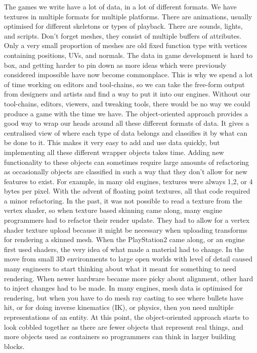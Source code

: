 \documentclass[a4paper,12pt]{article}
\begin{document}
The games we write have a lot of data, in a lot of different formats.
We have textures in multiple formats for multiple platforms.
There are animations, usually optimised for different skeletons or types of playback.
There are sounds, lights, and scripts.
Don't forget meshes, they consist of multiple buffers of attributes.
Only a very small proportion of meshes are old fixed function type with vertices containing positions, UVs, and normals.
The data in game development is hard to box, and getting harder to pin down as more ideas which were previously considered impossible have now become commonplace.
This is why we spend a lot of time working on editors and tool-chains, so we can take the free-form output from designers and artists and find a way to put it into our engines.
Without our tool-chains, editors, viewers, and tweaking tools, there would be no way we could produce a game with the time we have.
The object-oriented approach provides a good way to wrap our heads around all these different formats of data.
It gives a centralised view of where each type of data belongs and classifies it by what can be done to it.
This makes it very easy to add and use data quickly, but implementing all these different wrapper objects takes time.
Adding new functionality to these objects can sometimes require large amounts of refactoring as occasionally objects are classified in such a way that they don't allow for new features to exist.
For example, in many old engines, textures were always 1,2, or 4 bytes per pixel.
With the advent of floating point textures, all that code required a minor refactoring.
In the past, it was not possible to read a texture from the vertex shader, so when texture based skinning came along, many engine programmers had to refactor their render update.
They had to allow for a vertex shader texture upload because it might be necessary when uploading transforms for rendering a skinned mesh.
When the PlayStation2 came along, or an engine first used shaders, the very idea of what made a material had to change.
In the move from small 3D environments to large open worlds with level of detail caused many engineers to start thinking about what it meant for something to need rendering.
When newer hardware became more picky about alignment, other hard to inject changes had to be made.
In many engines, mesh data is optimised for rendering, but when you have to do mesh ray casting to see where bullets have hit, or for doing inverse kinematics (IK), or physics, then you need multiple representations of an entity.
At this point, the object-oriented approach starts to look cobbled together as there are fewer objects that represent real things, and more objects used as containers so programmers can think in larger building blocks.
\end{document}
